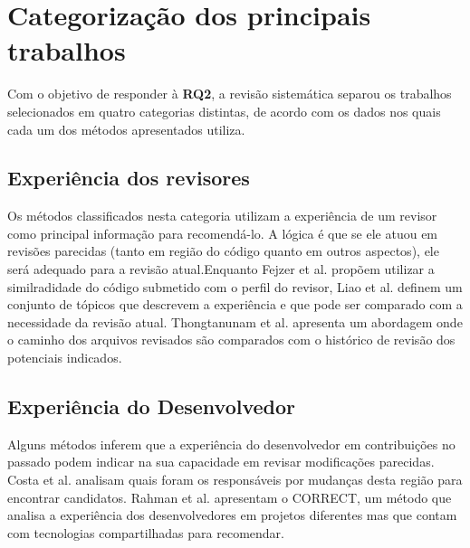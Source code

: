 \documentclass[12pt,openany,oneside,a4paper,english,brazil]{abntbibufjf}
\begin{document}
\section{Categorização dos principais trabalhos}\label{sec:metricas_resultados}

Com o objetivo de responder à \textbf{RQ2}, a revisão sistemática separou os trabalhos selecionados em quatro categorias distintas, de acordo com os dados nos quais cada um dos métodos apresentados utiliza.

\subsection{Experiência dos revisores}

Os métodos classificados nesta categoria utilizam a experiência de um revisor como principal informação para recomendá-lo. A lógica é que se ele atuou em revisões parecidas (tanto em região do código quanto em outros aspectos), ele será adequado para a revisão atual.Enquanto Fejzer et al. \cite{fejzer2017} propõem utilizar a similradidade do código submetido com o perfil do revisor, Liao et al. \cite{liao2017} definem um conjunto de tópicos que descrevem a experiência e que pode ser comparado com a necessidade da revisão atual. Thongtanunam et al. \cite{Thongtanunam2015-1} apresenta um abordagem onde o caminho dos arquivos revisados são comparados com o histórico de revisão dos potenciais indicados.

\subsection{Experiência do Desenvolvedor}
Alguns métodos inferem que a experiência do desenvolvedor em contribuições no passado podem indicar na sua capacidade em revisar modificações parecidas. Costa et al. \cite{costa2016} analisam quais foram os responsáveis por mudanças desta região para encontrar candidatos. Rahman et al. \cite{rahman2016} apresentam o CORRECT, um método que analisa a experiência dos desenvolvedores em projetos diferentes mas que contam com tecnologias compartilhadas para recomendar.
\end{document}
